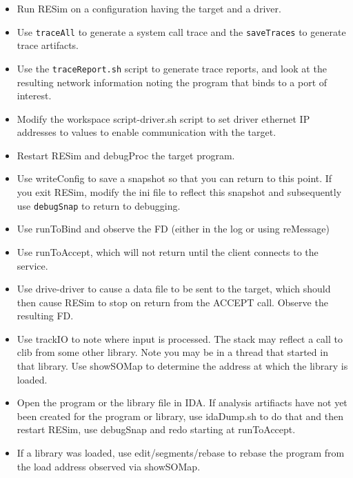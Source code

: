 \documentclass[titlepage]{article}
\begin{document}
\begin{itemize}
\item Run RESim on a configuration having the target and a driver.

\item Use {\tt traceAll} to generate a system call trace and the {\tt saveTraces} to generate
trace artifacts.

\item Use the {\tt traceReport.sh} script to generate trace reports,
and look at the resulting network information noting the
program that binds to a port of interest.

\item Modify the workspace script-driver.sh script to set
driver ethernet IP addresses to values to enable communication
with the target.

\item Restart RESim and debugProc the target program. 

\item Use writeConfig to save a snapshot so that you can return to this point.
If you exit RESim, modify the ini file to reflect this snapshot and subsequently
use {\tt debugSnap} to return to debugging.

\item Use runToBind and observe the FD (either in the log
or using reMessage)

\item Use runToAccept, which will not return until the client
connects to the service.  

\item Use drive-driver to cause a data file to be sent to the target, which 
should then cause RESim to stop on return from the ACCEPT call.  Observe the resulting FD.

\item Use trackIO to note where input is processed.  The stack
may reflect a call to clib from some other library.  Note
you may be in a thread that started in that library.  Use
showSOMap to determine the address at which
the library is loaded.

\item Open the program or the library file in IDA.  If analysis artifiacts have not yet
been created for the program or library, use idaDump.sh to do that and then restart RESim,
use debugSnap and redo starting at runToAccept. 

\item If a library was loaded, use edit/segments/rebase to rebase the program from the load address
observed via showSOMap.


\end{itemize}
\end{document}
